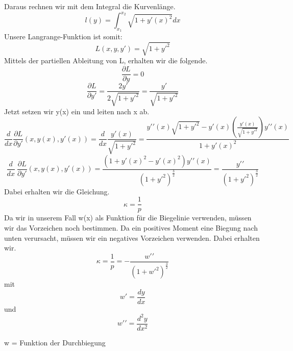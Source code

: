 Daraus rechnen wir mit dem Integral die Kurvenlänge.
\begin{equation}
	l(y)=
	\int_{x_1}^{x_2}\sqrt{1+{y\prime(x)}^2}dx
\end{equation}
Unsere Langrange-Funktion ist somit:
\begin{equation}
	L(x,y,y\prime)=
	\sqrt{1+{y\prime}^2}
\end{equation}
Mittels der partiellen Ableitung von L, erhalten wir die folgende.
\begin{equation}
	\frac{\partial L}{\partial y}=
	0
\end{equation}
\begin{equation}
	\frac{\partial L}{\partial y\prime}=
	\frac{2y\prime}{2\sqrt{1+{y\prime}^2}}=
	\frac{y\prime}{\sqrt{1+{y\prime}^2}}
\end{equation}
Jetzt setzen wir y(x) ein und leiten nach x ab.
\begin{equation}
	\frac{d}{dx}\frac{\partial L}{\partial y\prime}(x,y(x),y\prime(x))=
	\frac{d}{dx}\frac{y\prime(x)}{\sqrt{1+{y\prime}^2}}=
	\frac{y\prime\prime(x)\sqrt{1+{y\prime}^2}-y\prime(x)\left(\frac{y\prime(x)}{\sqrt{1+{y\prime}^2}}\right)y\prime\prime(x)}{1+{y\prime(x)}^2}
\end{equation}
\begin{equation}
	\frac{d}{dx}\ \frac{\partial L}{\partial y\prime}(x,y(x),y\prime(x))=
	\frac{(1+{y\prime(x)}^2-{y\prime(x)}^2)y\prime\prime(x)}{\left(1+{y\prime}^2\right)^\frac{3}{2}}=
	\frac{y\prime\prime}{\left(1+{y\prime}^2\right)^\frac{3}{2}}
\end{equation}
Dabei erhalten wir die Gleichung.
\begin{equation}
	\kappa=
	\frac{1}{p}
\end{equation}
Da wir in unserem Fall w(x) als Funktion für die Biegelinie verwenden, müssen wir das Vorzeichen noch bestimmen.
Da ein positives Moment eine Biegung nach unten verursacht, müssen wir ein negatives Vorzeichen verwenden. Dabei erhalten wir.
\begin{equation}
	\kappa=
	\frac{1}{p}=
	-\frac{w\prime\prime}{\left(1+{w\prime}^2\right)^\frac{3}{2}}
\end{equation}
mit
\begin{equation}
	w\prime=
	\frac{dy}{dx} 
\end{equation}
und
\begin{equation}
	w\prime\prime=
	\frac{d^2y}{dx^2}
\end{equation}

w = Funktion der Durchbiegung

